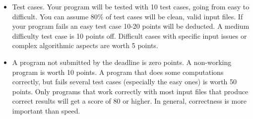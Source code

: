 \begin{itemize}
\item Test cases.
Your program will be tested with 10 test cases, going from easy to difficult.
You can assume 80\% of test cases will be clean, valid input files.
If your program fails an easy test case 10-20 points will be deducted.
A medium difficulty test case is 10 points off.
Difficult cases with specific input issues or complex algorithmic aspects are worth 5 points.

\item A program not submitted by the deadline is zero points.
A non-working program is worth 10 points.
A program that does some computations correctly, but fails several test cases (especially the easy ones) 
is worth 50 points.
Only programs that work correctly with most input files that produce correct results
will get a score of 80 or higher. In general, correctness is more important than speed.

\end{itemize}


% 


